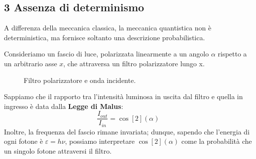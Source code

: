 \subsection*{3 Assenza di determinismo}
A differenza della meccanica classica, la meccanica quantistica non è deterministica, ma fornisce soltanto una descrizione probabilistica.
\begin{example}
    Consideriamo un fascio di luce, polarizzata linearmente a un angolo \(\alpha\) rispetto a un arbitrario asse \(x\),
    che attraversa un filtro polarizzatore lungo x.
    \begin{figure}[htbp]
        \centering
        \caption{Filtro polarizzatore e onda incidente.}
        \label{fig:polarizzatore}
    \end{figure}

    Sappiamo che il rapporto tra l'intensità luminosa in uscita dal filtro e quella in ingresso è 
    data dalla \textbf{Legge di Malus}: 
    \[
    \frac{I_{out}}{I_{in}}=\cos[2](\alpha)
    \]
    Inoltre, la frequenza del fascio rimane invariata; dunque, sapendo che l'energia di ogni fotone è
    \(\varepsilon= h \nu\), possiamo interpretare \(\cos[2](\alpha)\) come la probabilità che un singolo fotone
    attraversi il filtro.
\end{example}
